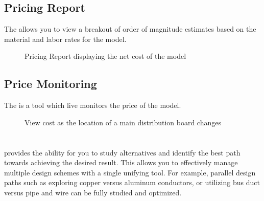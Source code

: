 \documentclass[letterpaper,10pt,english]{sphinxmanual}
\begin{document}
\subsection{Pricing Report}
\label{\detokenize{docs/productoverview/index-product_overview:pricing-report}}
The {\hyperref[\detokenize{docs/userguide/pricingmodel/pricingreport/index-pricing_report:pricing-report}]{}} allows you to view a breakout of order of magnitude estimates based on the material and labor rates for the model.

\begin{figure}[H]
\centering
\capstart

\noindent{}
\caption{Pricing Report displaying the net cost of the model}\label{\detokenize{docs/productoverview/index-product_overview:id5}}\end{figure}


\subsection{Price Monitoring}
\label{\detokenize{docs/productoverview/index-product_overview:price-monitoring}}
The {\hyperref[\detokenize{docs/userguide/pricingmodel/pricetracker/index-price_tracker:price-tracker}]{}} is a tool which live monitors the price of the model.

\begin{figure}[H]
\centering
\capstart

\noindent{}
\caption{View cost as the location of a main distribution board changes}\label{\detokenize{docs/productoverview/index-product_overview:id6}}\end{figure}


\section{}
\label{\detokenize{docs/productoverview/index-product_overview:branching}}
{\hyperref[\detokenize{docs/userguide/projectmanagement/issuancelog/index-issuance_log:issuance-log}]{}} provides the ability for you to study alternatives and identify the best path towards achieving the desired result.  This allows you to effectively manage multiple design schemes with a single unifying tool.  For example, parallel design paths such as exploring copper versus aluminum conductors, or utilizing bus duct versus pipe and wire can be fully studied and optimized.
\end{document}
